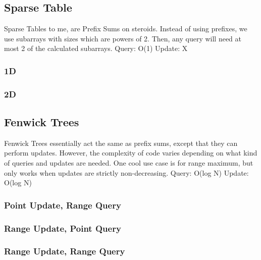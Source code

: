 \documentclass{article}
\begin{document}
\subsection{Sparse Table}

\begin{flushleft}
Sparse Tables to me, are Prefix Sums on steroids.
Instead of using prefixes, we use subarrays with sizes which are powers of 2.
Then, any query will need at most 2 of the calculated subarrays.
\newline
Query: O(1)
\newline
Update: X
\end{flushleft}

\subsubsection{1D}

\subsubsection{2D}


\subsection{Fenwick Trees}

\begin{flushleft}
Fenwick Trees essentially act the same as prefix sums,
except that they can perform updates. However, the complexity of code
varies depending on what kind of queries and updates are needed.
One cool use case is for range maximum, but only works when updates are strictly
non-decreasing.
\newline
Query: O(log N)
\newline
Update: O(log N)
\end{flushleft}

\subsubsection{Point Update, Range Query}

\subsubsection{Range Update, Point Query}

\subsubsection{Range Update, Range Query}

\end{document}
